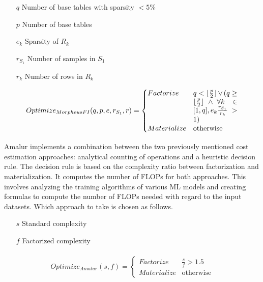 \begin{definition}
  \begin{itemize}
    \item[]
      \item[$q$]Number of base tables with sparsity $ < 5\% $
    \item[$p$] Number of base tables
    \item[$e_k$] Sparsity of $R_k$
    \item[$r_{S_1}$] Number of samples in $S_1$
    \item[$r_k$] Number of rows in $R_k$
  \end{itemize}

  \begin{align*}
    \begin{split}
      Optimize_{MorpheusFI}(q, p, e, r_{S_1}, r) =
      \begin{cases}
        Factorize   & \parbox[t]{.18\linewidth}{$q < \lfloor \frac{p}{2} \rfloor \vee ( q \geq \lfloor \frac{p}{2} \rfloor \wedge \forall k \in [1,q], e_k \frac{r_{S_1}}{r_k} > 1)$} \\
        Materialize & \text{otherwise}
      \end{cases}
    \end{split}
  \end{align*}
\end{definition}

Amalur \cite{amalur_tkde24} implements a combination between the two previously mentioned cost estimation approaches: analytical counting of operations and a heuristic decision rule. The decision rule is based on the complexity ratio between factorization and materialization. It computes the number of FLOPs for both approaches. This involves analyzing the training algorithms of various ML models and creating formulas to compute the number of FLOPs needed with regard to the input datasets. Which approach to take is chosen as follows.

\begin{definition}

  \begin{itemize}
    \item[]
    \item[$s$] Standard complexity
    \item[$f$] Factorized complexity
  \end{itemize}

  \begin{align*}
    \begin{split}
      Optimize_{Amalur}(s, f) =
      \begin{cases}
        Factorize   & \frac{s}{f} > 1.5 \\
        Materialize & \text{otherwise}
      \end{cases}
    \end{split}
  \end{align*}
\end{definition}


